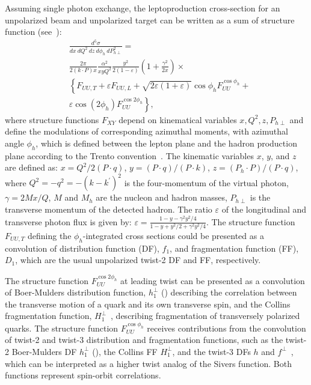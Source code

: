 \documentclass[aps,prl,twocolumn,showpacs,superscriptaddress,groupedaddress]{revtex4-1}  %
\newcommand{\zh}{z}
\newcommand{\xbj}{x}
\newcommand{\ph}{\phi_h}
\begin{document}
Assuming single photon exchange, the leptoproduction cross-section for an unpolarized beam and unpolarized target can be written as a sum of structure function (see~\cite{Bacchetta:2006tn}):
\begin{equation}
\label{eq:crosssection3}
\begin{split}
& \frac{d^{5} \sigma}{dx\ dQ^2\ dz\ d \phi_{h}\ dP_{h \perp}^{2}} =
\\
& \frac{2\pi}{2(k\cdot P)x} \frac{\alpha^{2}}{xyQ^{2}} \frac{y^{2}}{2 \left( 1 - \varepsilon \right)} \left( 1 + \frac{\gamma^{2}}{2x} \right) \times
\\
& \left\{ F_{UU,T} + \varepsilon F_{UU,L} + \sqrt{2 \varepsilon \left( 1 + \varepsilon \right)} \cos \phi_{h} F^{\cos \phi_{h}}_{UU} + \right.
\\
& \left. \varepsilon \cos \left( 2 \phi_{h} \right) F_{UU}^{\cos2\phi_{h}} \right\},
\end{split}
\end{equation}
where structure functions $F_{XY}$ depend on kinematical variables $x,Q^2,z,P_{h\perp}$ and define the modulations of corresponding azimuthal moments, with azimuthal angle $\phi_{h}$, which is defined between the lepton plane and the hadron production plane according to the Trento convention~\cite{Bacchetta:2004jz}.
The kinematic variables $\xbj$, $y$, and $z$  are defined as: 
$\xbj = Q^2/{2(P\cdot q)}$, $y={(P \cdot q)/(P \cdot k)}$, $\zh=(P_h \cdot P)/(P \cdot q)$, 
where $Q^2=-q^2=-(k-k^\prime)^2$ is the four-momentum 
of the virtual photon,  $\gamma=2M\xbj /Q$,
 $M$ and $M_h$ are the nucleon and hadron masses, $P_{h\perp}$ is the transverse momentum of the 
detected hadron.  The ratio $\varepsilon$ of the longitudinal and transverse photon flux is given by: $\varepsilon=\frac{1-y-\gamma^2y^2/4}{1-y+y^2/2+\gamma^2y^2/4}$.
The structure function  $F_{UU,T}$  defining the $\phi_h$-integrated cross sections could be presented as a convolution of  distribution function (DF), $f_1$,   and fragmentation function (FF), $D_1$, which  are the usual unpolarized twist-2 DF and FF, respectively. 

The structure function $F^{\cos 2\ph}_{UU}$ at leading twist can be presented as a convolution of Boer-Mulders distribution function, $h_1^\perp$ (\cite{Boer:1997nt}) describing the correlation between the transverse motion
of a quark and its own transverse spin, and  the Collins fragmentation function, $H_1^{\perp}$~\cite{Collins:1992kk}, describing fragmentation of transversely polarized quarks.
The structure function $F^{\cos \ph}_{UU}$  receives contributions 
from the convolution of twist-2 and twist-3 distribution and fragmentation functions,
such as the twist-2 Boer-Mulders DF $h_1^\perp$ (\cite{Boer:1997nt,Pasquini:2010af}), the Collins FF $H_1^{\perp}$, and the twist-3 DFs $h$ and $f^\perp$~\cite{Bacchetta:2006tn}, which can be interpreted as a higher twist analog of the Sivers function. Both functions represent spin-orbit correlations. 
\end{document}
